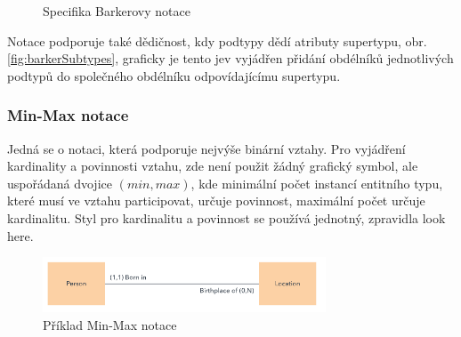 \documentclass[czech,bachelor,public,dept460,male,oneside]{diploma}
\begin{document}
	\begin{figure}[!h]
		\centering
		\qquad
		\caption[Specifika Barkerovy notace]{Specifika Barkerovy notace}
	\end{figure}

	Notace podporuje také dědičnost, kdy podtypy dědí atributy supertypu, obr. \ref{fig:barkerSubtypes}, graficky je tento jev vyjádřen přidání obdélníků jednotlivých podtypů do společného obdélníku odpovídajícímu supertypu.
	
	\subsubsection{Min-Max notace}
	Jedná se o notaci, která podporuje nejvýše binární vztahy. Pro vyjádření kardinality a povinnosti vztahu, zde není použit žádný grafický symbol, ale uspořádaná dvojice $(min, max)$, kde minimální počet instancí entitního typu, které musí ve vztahu participovat, určuje povinnost, maximální počet určuje kardinalitu. Styl pro kardinalitu a povinnost se používá jednotný, zpravidla look here.
	
	\begin{figure}[!h]
		\centering
		\includegraphics[width=0.75\textwidth]{Figures/NotationExMinMax}
		\caption[Příklad Min-Max notace]{Příklad Min-Max notace \cite{whatIsERD}}
	\end{figure}
	
\end{document}
